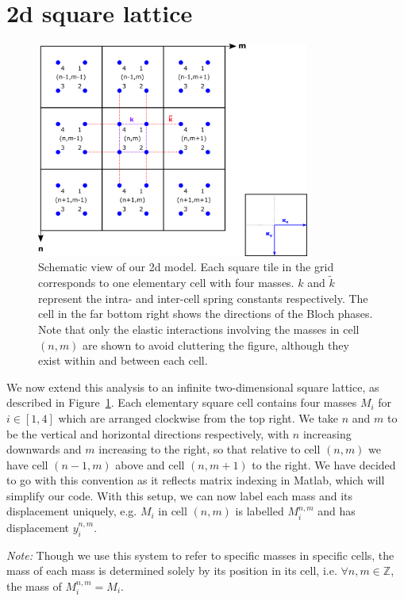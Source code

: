\section{2d square lattice}
\begin{figure}[!h]
\centering
\includegraphics[width=0.8\textwidth]{imgs/sqmodel.png}
\caption{\label{fig:sqscheme} Schematic view of our 2d model. Each square
  tile in the grid corresponds to one elementary cell with four masses. $k$ and
  $\tilde{k}$ represent the intra- and inter-cell spring constants
  respectively. The cell in the far bottom right shows the directions of the
  Bloch phases. Note that only the elastic interactions involving the masses in
  cell $(n,m)$ are shown to avoid cluttering the figure, although they exist
  within and between each cell.}
\end{figure}

We now extend this analysis to an infinite two-dimensional square lattice, as
described in Figure~\ref{fig:sqscheme}. Each elementary square cell contains
four masses $M_i$ for $i\in\left[1, 4\right]$ which are arranged clockwise from
the top right. We take $n$ and $m$ to be the vertical and horizontal directions
respectively, with $n$ increasing downwards and $m$ increasing to the right, so
that relative to cell $(n, m)$ we have cell $(n-1,m)$ above and cell $(n,m+1)$
to the right. We have decided to go with this convention as it reflects matrix
indexing in Matlab, which will simplify our code. With this setup, we can now
label each mass and its displacement uniquely, e.g. $M_i$ in cell $(n, m)$ is
labelled $M_i^{n,m}$ and has displacement $y_i^{n,m}$.

\textit{Note:} Though we use this system to refer to specific masses in
specific cells, the mass of each mass is determined solely by its position in
its cell, i.e. $\forall n,m\in\mathbb{Z}$, the mass of $M_i^{n,m}=M_i$.

